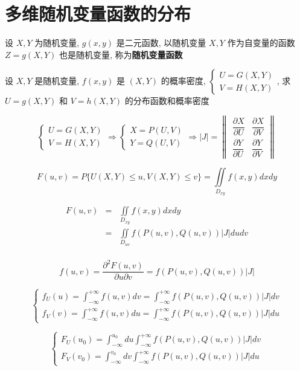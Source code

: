 \section{多维随机变量函数的分布}
\begin{definition}[二维随机变量函数]
	设 $X,Y$ 为随机变量, $g(x,y)$ 是二元函数, 以随机变量 $X,Y$ 作为自变量的函数 $Z = g(X,Y)$ 也是随机变量, 称为\textbf{随机变量函数}
\end{definition}
\begin{theorem}[随机变量函数分布函数和概率密度]
	设 $X,Y$ 是随机变量, $f(x,y)$ 是 $(X,Y)$ 的概率密度, 
	$\begin{cases}
		U = G(X,Y)\\
		V = H(X,Y)
	\end{cases}$, 求 $U = g(X,Y)$ 和 $V = h(X,Y)$ 的分布函数和概率密度

	$$\begin{cases}
		U = G(X,Y)\\
		V = H(X,Y)
	\end{cases}\Rightarrow 
	\begin{cases}
		X = P(U,V)\\
		Y = Q(U,V)
	\end{cases}\Rightarrow
	\big|J\big| = 
	\begin{Vmatrix}
		\dfrac{\partial X}{\partial U} & \dfrac{\partial X}{\partial V}\\
		\dfrac{\partial Y}{\partial U} & \dfrac{\partial Y}{\partial V}
	\end{Vmatrix}$$

	$$F(u,v) = P\{U(X,Y)\leq u, V(X,Y)\leq v\} = \iint\limits_{D_{xy}}f(x,y)dxdy$$
	
	\begin{eqnarray*}
		F(u,v) & = & \iint\limits_{D_{xy}}f(x,y)dxdy\\
			   & = & \iint\limits_{D_{uv}}f(P(u,v),Q(u,v))\big|J\big|dudv\\
	\end{eqnarray*}

	$$f(u,v) = \dfrac{\partial^{2}F(u,v)}{\partial u \partial v} = f(P(u,v),Q(u,v))\big|J\big|$$

	$$\begin{cases}
		f_{U}(u) = \int_{-\infty}^{+\infty}f(u,v)dv = \int_{-\infty}^{+\infty}f(P(u,v),Q(u,v))\big|J\big|dv\\
		f_{V}(v) = \int_{-\infty}^{+\infty}f(u,v)du = \int_{-\infty}^{+\infty}f(P(u,v),Q(u,v))\big|J\big|du
	\end{cases}$$

	$$\begin{cases}
		F_{U}(u_{0}) = \int_{-\infty}^{u_{0}}du\int_{-\infty}^{+\infty}f(P(u,v),Q(u,v))\big|J\big|dv\\
		F_{V}(v_{0}) = \int_{-\infty}^{v_{0}}dv\int_{-\infty}^{+\infty}f(P(u,v),Q(u,v))\big|J\big|du
	\end{cases}$$
\end{theorem}

